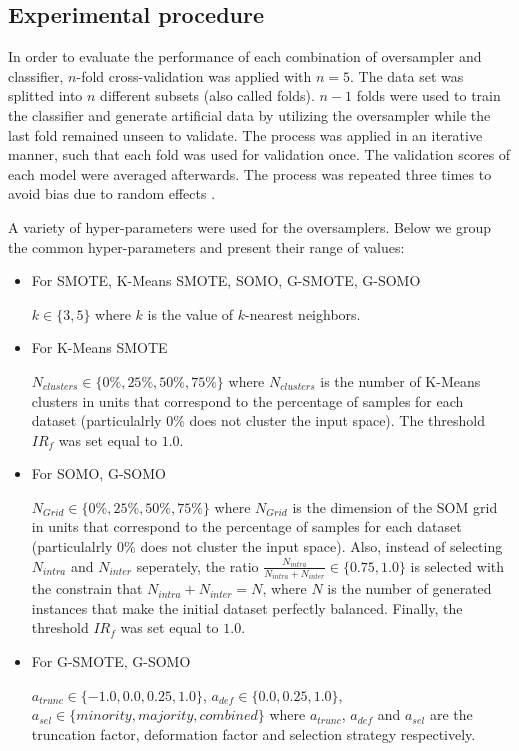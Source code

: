 \documentclass[parskip=full]{scrartcl}
\begin{document}
\subsection{Experimental procedure}

In order to evaluate the performance of each combination of oversampler and classifier, $n$-fold cross-validation was applied with $n = 5$. The data set was splitted into $n$ different subsets (also called folds). $n-1$ folds were used to train the classifier and generate artificial data by utilizing the oversampler while the last fold remained unseen to validate. The process was applied in an iterative manner, such that each fold was used for validation once. The validation scores of each model were averaged afterwards. The process was repeated three times to avoid bias due to random effects \cite{Japkowicz2013}.

A variety of hyper-parameters were used for the oversamplers. Below we group the common hyper-parameters and present their range of values:

\begin{itemize}

	\renewcommand\labelitemi{--}

	\item For SMOTE, K-Means SMOTE, SOMO, G-SMOTE, G-SOMO
	
	$k \in \{3, 5 \}$ where $k$ is the value of $k$-nearest neighbors.

	\item For K-Means SMOTE
	
	$ N_{clusters} \in \{0\%, 25\%, 50\%, 75\% \} $ where $N_{clusters}$ is the number of K-Means clusters in units that correspond to the percentage of samples for each dataset (particulalrly $ 0\% $ does not cluster the input space). The threshold $ IR_{f} $ was set equal to $ 1.0 $.

	\item For SOMO, G-SOMO

	$ N_{Grid} \in \{0\%, 25\%, 50\%, 75\% \} $ where $N_{Grid}$ is the dimension of the SOM grid in units that correspond to the percentage of samples for each dataset (particulalrly $ 0\% $ does not cluster the input space). Also, instead of selecting $N_{intra}$ and $N_{inter}$ seperately, the ratio $ \frac{N_{intra}}{N_{intra} + N_{inter}} \in \{0.75, 1.0 \} $ is selected with the constrain that $N_{intra} + N_{inter} = N$, where $N$ is the number of generated instances that make the initial dataset perfectly balanced. Finally, the threshold $ IR_{f} $ was set equal to $ 1.0 $.

	\item For G-SMOTE, G-SOMO
	
	$ a_{trunc} \in \{-1.0, 0.0, 0.25, 1.0\} $, $ a_{def} \in \{0.0, 0.25, 1.0\} $,  $ a_{sel} \in \{ minority, majority, combined \} $ where $a_{trunc}$, $a_{def}$ and $a_{sel}$ are the truncation factor, deformation factor and selection strategy respectively.

\end{itemize}
\end{document}
